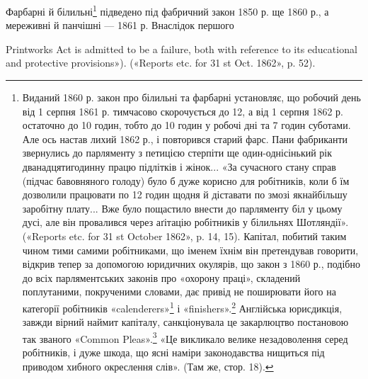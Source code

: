 Фарбарні й білильні\footnote{
Виданий 1860 р. закон про білильні та фарбарні установляє,
що робочий день від 1 серпня 1861 р. тимчасово скорочується до 12, а
від 1 серпня 1862 р. остаточно до 10 годин, тобто до 10 годин у робочі
дні та 7 годин суботами. Але ось настав лихий 1862 р., і повторився
старий фарс. Пани фабриканти звернулись до парляменту з петицією
стерпіти ще один-однісінький рік дванадцятигодинну працю підлітків
і жінок... «За сучасного стану справ (підчас бавовняного голоду) було б
дуже корисно для робітників, коли б їм дозволили працювати по 12 годин
щодня й діставати по змозі якнайбільшу заробітну плату... Вже було
пощастило внести до парляменту біл у цьому дусі, але він провалився
через аґітацію робітників у білильнях Шотляндії». («Reports etc. for
31 st October 1862», p. 14, 15). Капітал, побитий таким чином тими самими
робітниками, що іменем їхнім він претендував говорити, відкрив тепер
за допомогою юридичних окулярів, що закон з 1860 р., подібно до всіх
парляментських законів про «охорону праці», складений поплутаними,
покрученими словами, дає привід не поширювати його на категорії робітників
«calenderers»\footnote*{
— пресувальники сукна. \emph{Ред.}
} і «finishers».\footnote*{
— апретери. \emph{Ред.}
} Англійська юрисдикція, завжди
вірний наймит капіталу, санкціонувала це закарлюцтво постановою так
званого «Common Pleas».\footnote*{
— цивільний суд. \emph{Ред.}
} «Це викликало велике незадоволення серед
робітників, і дуже шкода, що ясні наміри законодавства нищиться під
приводом хибного окреслення слів». (Там же, стор. 18).
} підведено під фабричний закон 1850 р.
ще 1860 р., а мереживні й панчішні — 1861 р. Внаслідок першого

Printworks Act is admitted to be a failure, both with reference to its educational
and protective provisions»). («Reports etc. for 31 st Oct. 1862», p. 52).
\parbreak{}  %
